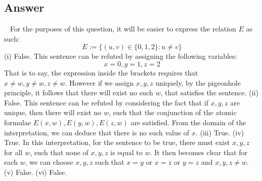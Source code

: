 \documentclass[12pt]{fphw}
\begin{document}
\subsection*{Answer} \ \newline
For the purposes of this question, it will be easier to express the relation $E$ as such:
$$
E := \{(u,v) \in \{0,1,2\} : u \neq v \}
$$
(i) False. This sentence can be refuted by assigning the following variables:
$$
x = 0, y = 1, z = 2
$$
That is to say, the expression inside the brackets requires that $x \neq w, y \neq w, z \neq w$. However if we assign $x,y,z$ uniquely, by the pigeonhole principle, it follows that there will exist no such $w$, that satisfies the sentence. \newline \newline
(ii) False. This sentence can be refuted by considering the fact that if $x, y, z$ are unique, then there will exist no $w$, such that the conjunction of the atomic formulae $E(x,w), E(y,w), E(z,w)$ are satisfied. From the domain of the interpretation, we can deduce that there is no such value of $x$. \newline \newline
(iii) True. \newline \newline
(iv) True. In this interpretation, for the sentence to be true, there must exist $x,y,z$ for all $w$, such that none of $x,y,z$ is equal to $w$. It then becomes clear that for each $w$, we can choose $x,y,z$ such that $x=y$ or $x = z$ or $y = z$ and $x,y,z \neq w$.\newline \newline
(v) False. \newline \newline
(vi) False. \newline \newline
\end{document}
